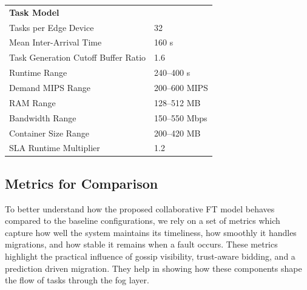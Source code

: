 \documentclass{article}
\begin{document}
\begin{table}[h!]
\begin{tabular}{ll}
\midrule
\textbf{Task Model} &  \\
Tasks per Edge Device & 32 \\
Mean Inter-Arrival Time & 160 s \\
Task Generation Cutoff Buffer Ratio & 1.6 \\
Runtime Range & 240--400 s \\
Demand MIPS Range & 200--600 MIPS \\
RAM Range & 128--512 MB \\
Bandwidth Range & 150--550 Mbps \\
Container Size Range & 200--420 MB \\
SLA Runtime Multiplier & 1.2 \\
\bottomrule
\end{tabular}
\end{table}

\subsection{Metrics for Comparison}

To better understand how the proposed collaborative FT model behaves compared to the baseline configurations, we rely on a set of metrics which capture how well the system maintains its timeliness, how smoothly it handles migrations, and how stable it remains when a fault occurs. These metrics highlight the practical influence of gossip visibility, trust-aware bidding, and a prediction driven migration. They help in showing how these components shape the flow of tasks through the fog layer.
\end{document}
